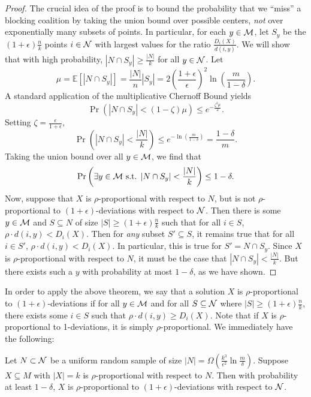 \begin{proof}
The crucial idea of the proof is to bound the probability that we ``miss'' a blocking coalition by taking the union bound over possible centers, \textit{not} over exponentially many subsets of points. In particular, for each $y \in \mathcal{M}$, let $S_y$ be the $(1+\epsilon)\frac{n}{k}$ points $i \in \mathcal {N}$ with largest values for the ratio $\frac{D_i(X)}{d(i, y)}$. We will show that with high probability, $| N \cap S_y | \geq \frac{|N|}{k}$ for all $y \in \mathcal {N}$. Let 
$$\mu = \mathbb{E}\left[| N \cap S_y |\right] = \frac{|N|}{n} |S_y| = 2 \left(\frac{1+\epsilon}{\epsilon}\right)^2 \ln \left(\frac{m}{1-\delta}\right). $$ 
A standard application of the multiplicative Chernoff Bound yields 
$$\Pr \left( | N \cap S_y | < (1-\zeta) \mu \right) \leq e^{-\frac{\zeta^2 \mu }{2}}.$$  
Setting $\zeta = \frac{\epsilon}{1+\epsilon}$, 
$$\Pr \left( | N \cap S_y | < \frac{|N|}{k} \right) \leq e^{-\ln \left(\frac{m}{1-\delta}\right)} = \frac{1-\delta}{m}.$$
Taking the union bound over all $y \in \mathcal{M}$, we find that
$$\Pr \left( \exists y \in \mathcal{M} \mbox{ s.t. } | N \cap S_y | < \frac{|N|}{k} \right) \leq 1 - \delta. $$
Now, suppose that $X$ is $\rho$-proportional with respect to $N$, but is not $\rho$-proportional to $(1+\epsilon)$-deviations with respect to $\mathcal {N}$. Then there is some $y \in \mathcal{M}$ and $S \subseteq N$ of size $|S| \geq (1+\epsilon)\frac{n}{k}$ such that for all $i \in S$, $\rho \cdot d(i, y) < D_i(X)$. Then for \textit{any} subset $S' \subseteq S$, it remains true that for all $i \in S'$, $\rho \cdot d(i, y) < D_i(X)$. In particular, this is true for $S' = N \cap S_y$. Since $X$ is $\rho$-proportional with respect to $N$, it must be the case that $|N \cap S_y| < \frac{|N|}{k}$. But there exists such a $y$ with probability at most $1-\delta$, as we have shown.  
\end{proof}
\fi

In order to apply the above theorem, we say that a solution $X$ is $\rho$-proportional to $(1+\epsilon)$-deviations if for all $y \in \mathcal{M}$ and for all $S \subseteq \mathcal {N}$ where $|S| \geq (1+\epsilon) \frac{n}{k}$, there exists some $i \in S$ such that $\rho \cdot d(i, y) \geq D_i(X)$. Note that if $X$ is $\rho$-proportional to 1-deviations, it is simply $\rho$-proportional. We immediately have the following: 

\begin{corollary}
Let $N \subset \mathcal {N}$ be a uniform random sample of size $|N| = \Omega \left(\frac{k^3}{\epsilon^2} \ln \frac{m}{\delta}\right)$. Suppose $X \subseteq M$ with $|X| = k$ is $\rho$-proportional with respect to $N$. Then with probability at least $1-\delta$, $X$ is $\rho$-proportional to $(1+\epsilon)$-deviations with respect to $\mathcal {N}$.
\end{corollary}

